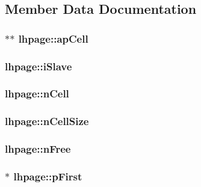 \subsection{Member Data Documentation}
\hypertarget{structlhpage_a8acf3fd1637af761b21b15ba3bbc976f}{
\subsubsection[{ap\-Cell}]{$\ast$$\ast$ lhpage\-::ap\-Cell}}\label{db/d20/structlhpage_a8acf3fd1637af761b21b15ba3bbc976f}
\hypertarget{structlhpage_aad091461ae49e16228bc5daec339200c}{
\subsubsection[{i\-Slave}]{ lhpage\-::i\-Slave}}\label{db/d20/structlhpage_aad091461ae49e16228bc5daec339200c}
\hypertarget{structlhpage_a433bbb9307d3df54da0593cd29fc50a1}{
\subsubsection[{n\-Cell}]{ lhpage\-::n\-Cell}}\label{db/d20/structlhpage_a433bbb9307d3df54da0593cd29fc50a1}
\hypertarget{structlhpage_a5e50331371add994c60e1fda10f467d7}{
\subsubsection[{n\-Cell\-Size}]{ lhpage\-::n\-Cell\-Size}}\label{db/d20/structlhpage_a5e50331371add994c60e1fda10f467d7}
\hypertarget{structlhpage_a273cee73f791159e187e6084d5955b22}{
\subsubsection[{n\-Free}]{ lhpage\-::n\-Free}}\label{db/d20/structlhpage_a273cee73f791159e187e6084d5955b22}
\hypertarget{structlhpage_a4fcd142ee6fe14ba79dde47403bbff16}{
\subsubsection[{p\-First}]{ $\ast$ lhpage\-::p\-First}}\label{db/d20/structlhpage_a4fcd142ee6fe14ba79dde47403bbff16}
